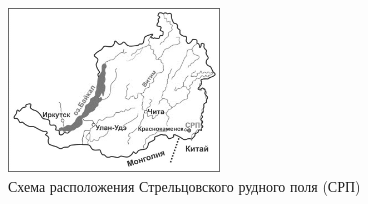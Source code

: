 \begin{figure}
  \begin{center}
    \includegraphics[width=0.5\textwidth]{authors/mandzhieva-fig-1.png}
  \end{center}
  \caption{Схема расположения Стрельцовского рудного поля (СРП)}
  \label{fig:mandzhieva-fig-1}
\end{figure}
